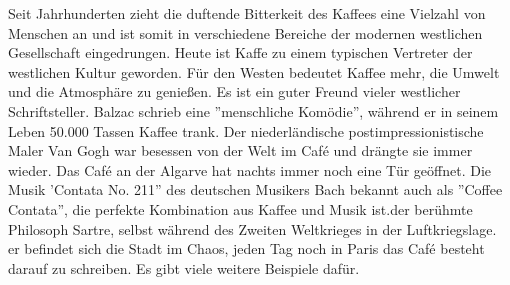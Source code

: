 \mypar
Seit Jahrhunderten zieht die duftende Bitterkeit des Kaffees eine Vielzahl von Menschen an und ist somit in verschiedene Bereiche der modernen westlichen Gesellschaft eingedrungen.  Heute ist Kaffe zu einem typischen Vertreter der westlichen Kultur geworden. Für den Westen bedeutet Kaffee mehr, die Umwelt und die Atmosphäre zu genie\ss en. Es ist ein guter Freund vieler westlicher Schriftsteller. Balzac schrieb eine ''menschliche Komödie'', während er in seinem Leben 50.000 Tassen Kaffee trank. Der niederländische postimpressionistische Maler Van Gogh war besessen von der Welt im Café und drängte sie immer wieder. Das Café an der Algarve hat nachts immer noch eine Tür geöffnet. Die Musik 'Contata No. 211'' des deutschen Musikers Bach bekannt auch als ''Coffee Contata'', die perfekte Kombination aus Kaffee und Musik ist.der berühmte Philosoph Sartre, selbst während des Zweiten Weltkrieges in der Luftkriegslage. er befindet sich die Stadt im Chaos, jeden Tag noch in Paris das Café besteht darauf zu schreiben. Es gibt viele weitere Beispiele dafür.